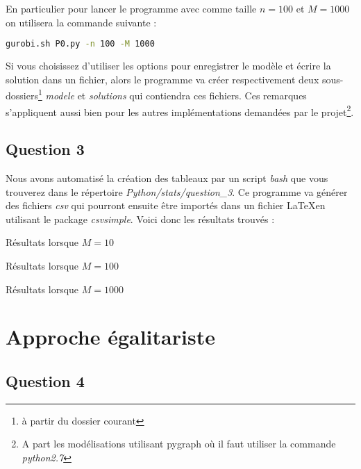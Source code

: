 \documentclass[a4paper, titlepage, oneside, 12pt]{article}%
\begin{document}
En particulier pour lancer le programme avec comme taille $n=100$ et $M=1000$ on utilisera la commande suivante :
\begin{lstlisting}[language=bash]
gurobi.sh P0.py -n 100 -M 1000
\end{lstlisting}

Si vous choisissez d'utiliser les options pour enregistrer le modèle et écrire la solution dans un fichier, alors le programme va créer respectivement deux sous-dossiers\footnote{à partir du dossier courant} \textit{modele} et \textit{solutions} qui contiendra ces fichiers. Ces remarques s'appliquent aussi bien pour les autres implémentations demandées par le projet\footnote{A part les modélisations utilisant pygraph où il faut utiliser la commande \textit{python2.7}}.

\subsection{Question 3}

Nous avons automatisé la création des tableaux par un script \textit{bash} que vous trouverez dans le répertoire \textit{Python/stats/question\_3}. Ce programme va générer des fichiers \textit{csv} qui pourront ensuite être importés dans un fichier \LaTeX en utilisant le package \textit{csvsimple}. Voici donc les résultats trouvés :


\begin{table}[h]
\centerline{
}
\caption{Résultats lorsque $M=10$}
\centerline{
}
\caption{Résultats lorsque $M=100$}
\centerline{
}
\caption{Résultats lorsque $M=1000$}

\end{table}

\section{Approche égalitariste}
\subsection{Question 4}
\end{document}
